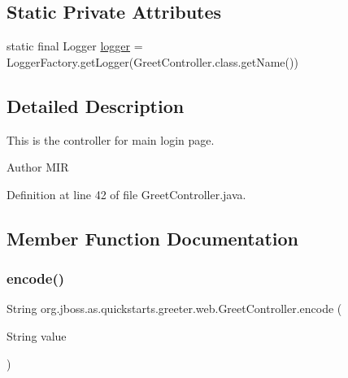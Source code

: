 \subsection*{Static Private Attributes}
\begin{DoxyCompactItemize}
\item 
static final Logger \hyperlink{classorg_1_1jboss_1_1as_1_1quickstarts_1_1greeter_1_1web_1_1_greet_controller_ae47edccff96c17bd8a3b97c5230da637}{logger} = Logger\+Factory.\+get\+Logger(Greet\+Controller.\+class.\+get\+Name())
\end{DoxyCompactItemize}


\subsection{Detailed Description}
This is the controller for main login page. 

\begin{DoxyAuthor}{Author}
M\+IR 
\end{DoxyAuthor}


Definition at line 42 of file Greet\+Controller.\+java.



\subsection{Member Function Documentation}
\mbox{\label{classorg_1_1jboss_1_1as_1_1quickstarts_1_1greeter_1_1web_1_1_greet_controller_ae7bdc856c05b408d1a28731865ed7648}} 
\subsubsection{\texorpdfstring{encode()}{encode()}}
{\footnotesize\ttfamily String org.\+jboss.\+as.\+quickstarts.\+greeter.\+web.\+Greet\+Controller.\+encode (\begin{DoxyParamCaption}\item[{String}]{value }\end{DoxyParamCaption})}



